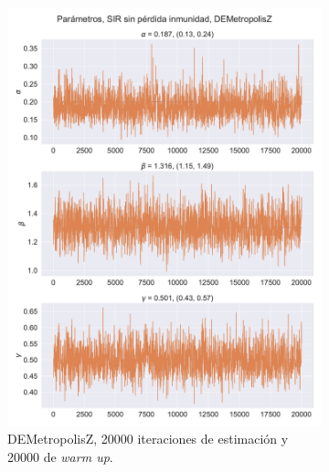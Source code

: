\begin{figure}[h]
    \centering
    \begin{subfigure}[b]{0.49\linewidth}
        \centering
        \includegraphics[width=\linewidth]{img/content/chapter4/DEMetropolis_sir_rec_params_trace.pdf}
        \caption{DEMetropolisZ, 20000 iteraciones de estimación y 20000 de \textit{warm up}.}
        \label{fig:NUTS_sir_rec_params_trace}
    \end{subfigure}
    \begin{subfigure}[b]{0.49\linewidth}
        \centering

\end{subfigure}
\end{figure}
